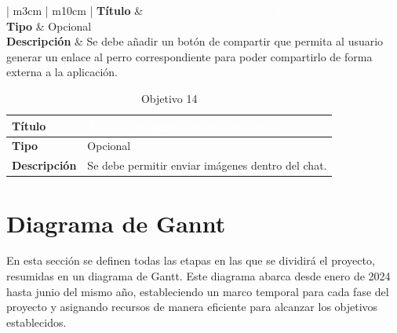 \documentclass[a4paper, 12pt]{article}
\begin{document}
\begin{table}[H]
	\captionsetup{width=0.95\linewidth}%
   	\captionsetup{singlelinecheck=false}%
	\captionsetup{font=bf}
	\caption{Objetivo 13}
	\begin{tabular}{ | m{3cm} | m{10cm} | }
		\hline {}\textbf{Título} &  \textcolor{white}{\textit{Compartir perros a través de enlace}}  \\ \hline
		\textbf{Tipo} & Opcional \\ \hline
		\textbf{Descripción} & Se debe añadir un botón de compartir que permita al usuario generar un enlace al perro correspondiente para poder compartirlo de forma externa a la aplicación. \\ \hline
	\end{tabular}
\end{table}  

\begin{table}[H]
	\captionsetup{width=0.95\linewidth}%
   	\captionsetup{singlelinecheck=false}%
	\captionsetup{font=bf}
	\caption{Objetivo 14}
	\begin{tabular}{ | m{3cm} | m{10cm} | }
		\hline \cellcolor{lightgray}\textbf{Título} & \cellcolor{gray} \textcolor{white}{\textit{Mandar imágenes dentro del chat}}  \\ \hline
		\cellcolor{lightgray}\textbf{Tipo} & Opcional \\ \hline
		\cellcolor{lightgray}\textbf{Descripción} & Se debe permitir enviar imágenes dentro del chat. \\ \hline
	\end{tabular}
\end{table} 

\newpage

\section{Diagrama de Gannt}

En esta sección se definen todas las etapas en las que se dividirá el proyecto, resumidas en un diagrama de Gantt. Este diagrama abarca desde enero de 2024 hasta junio del mismo año, estableciendo un marco temporal para cada fase del proyecto y asignando recursos de manera eficiente para alcanzar los objetivos establecidos.
\end{document}
